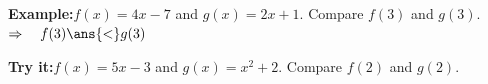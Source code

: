 \documentclass[12pt]{article}
\begin{document}
\begin{examplebox}
\textbf{Example:}\quad $f(x) = 4x - 7$ and $g(x) = 2x + 1$. Compare $f(3)$ and $g(3)$.
$\Rightarrow\quad f(3) \ans{<} g(3)$
\end{examplebox}

\begin{tryitbox}
\textbf{Try it:}\quad $f(x) = 5x - 3$ and $g(x) = x^2 + 2$. Compare $f(2)$ and $g(2)$.\\[2pt]
\end{tryitbox}
\end{document}
